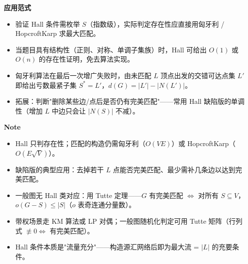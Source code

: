 \textbf{应用范式}
\begin{itemize}
\item 验证 Hall 条件需枚举 $S$（指数级），实际判定存在性应直接用匈牙利 / HopcroftKarp 求最大匹配。
\item 当题目具有结构性（正则、对称、单调子集族）时，Hall 可给出 $O(1)$ 或 $O(n)$ 的存在性证明，免去算法实现。
\item 匈牙利算法在最后一次增广失败时，由未匹配 $L$ 顶点出发的交错可达点集 $L'$ 即给出亏数最紧子集 $S^*=L'$，$d(G)=|L'|-|N(L')|$。
\item 拓展：判断"删除某些边/点后是否仍有完美匹配"——常用 Hall 缺陷版的单调性（增加 $L$ 中边只会让 $|N(S)|$ 不减）。
\end{itemize}

\textbf{Note}
\begin{itemize}
\item Hall 只判存在性；匹配的构造仍需匈牙利（$O(VE)$）或 HopcroftKarp（$O(E\sqrt{V})$）。
\item 缺陷版的典型应用：去掉若干 $L$ 点能否完美匹配、最少需补几条边以达到完美匹配。
\item 一般图无 Hall 类对应：用 Tutte 定理——$G$ 有完美匹配 $\iff$ 对所有 $S\subseteq V$，$o(G-S)\le |S|$（$o$ 表奇连通分量数）。
\item 带权场景走 KM 算法或 LP 对偶；一般图随机化判定可用 Tutte 矩阵（行列式 $\not\equiv 0 \iff$ 有完美匹配）。
\item Hall 条件本质是"流量充分"——构造源汇网络后即为最大流 = $|L|$ 的充要条件。
\end{itemize}
